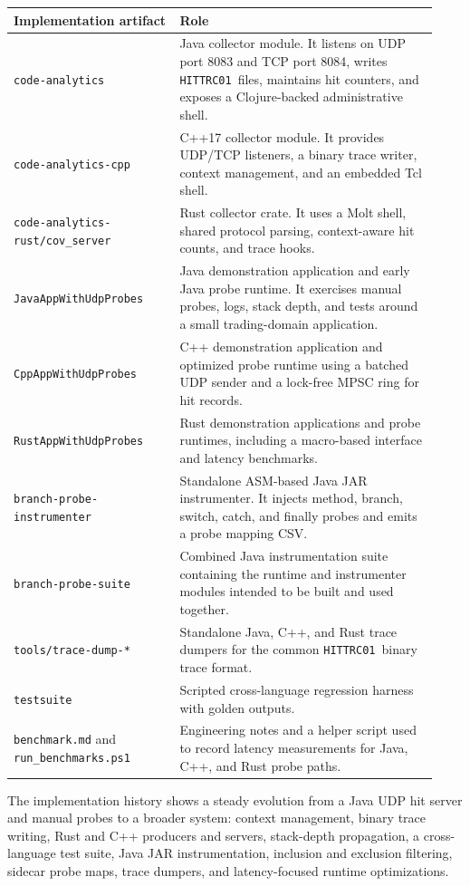 \documentclass[11pt]{article}
\newcommand{\hittrace}{\texttt{HITTRC01}}
\newcommand{\code}[1]{\texttt{#1}}
\begin{document}
\begingroup
\small
\begin{longtable}{>{\raggedright\arraybackslash}p{0.36\linewidth}%
                  >{\raggedright\arraybackslash}p{0.57\linewidth}}
\textbf{Implementation artifact} & \textbf{Role} \\
\hline
\code{code-analytics} & Java collector module. It listens on UDP port 8083 and
TCP port 8084, writes \hittrace\ files, maintains hit counters, and exposes a
Clojure-backed administrative shell. \\
\code{code-analytics-cpp} & C++17 collector module. It provides UDP/TCP
listeners, a binary trace writer, context management, and an embedded Tcl
shell. \\
\code{code-analytics-rust/cov\_server} & Rust collector crate. It uses a Molt
shell, shared protocol parsing, context-aware hit counts, and trace hooks. \\
\code{JavaAppWithUdpProbes} & Java demonstration application and early Java
probe runtime. It exercises manual probes, logs, stack depth, and tests around
a small trading-domain application. \\
\code{CppAppWithUdpProbes} & C++ demonstration application and optimized probe
runtime using a batched UDP sender and a lock-free MPSC ring for hit records. \\
\code{RustAppWithUdpProbes} & Rust demonstration applications and probe
runtimes, including a macro-based interface and latency benchmarks. \\
\code{branch-probe-instrumenter} & Standalone ASM-based Java JAR
instrumenter. It injects method, branch, switch, catch, and finally probes and
emits a probe mapping CSV. \\
\code{branch-probe-suite} & Combined Java instrumentation suite containing the
runtime and instrumenter modules intended to be built and used together. \\
\code{tools/trace-dump-*} & Standalone Java, C++, and Rust trace dumpers for
the common \hittrace\ binary trace format. \\
\code{testsuite} & Scripted cross-language regression harness with golden
outputs. \\
\code{benchmark.md} and \code{run\_benchmarks.ps1} & Engineering notes and a
helper script used to record latency measurements for Java, C++, and Rust probe
paths. \\
\end{longtable}
\endgroup

The implementation history shows a steady evolution from a Java UDP hit server and manual
probes to a broader system: context management, binary trace writing, Rust and
C++ producers and servers, stack-depth propagation, a cross-language test
suite, Java JAR instrumentation, inclusion and exclusion filtering, sidecar
probe maps, trace dumpers, and latency-focused runtime optimizations.
\end{document}
